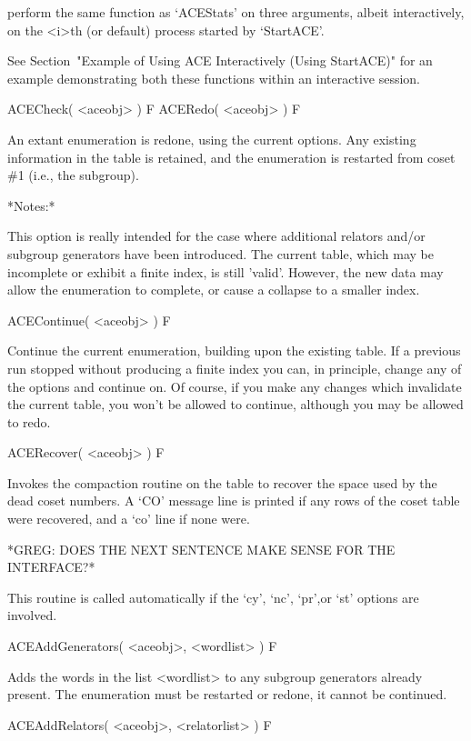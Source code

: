 perform the same function as `ACEStats'  on  three  arguments,  albeit
interactively,  on  the  <i>th  (or  default)   process   started   by
`StartACE'.

See Section~"Example of Using ACE Interactively (Using StartACE)"  for
an example demonstrating both these functions  within  an  interactive
session.


\>ACECheck( <aceobj> ) F
\>ACERedo( <aceobj> ) F

An extant  enumeration is redone,  using the current  options.  Any
existing information in the table  is retained, and the enumeration is
restarted from coset \#1 (i.e., the subgroup).

*Notes:*

This option is really intended  for the case where additional relators
and/or subgroup  generators have been introduced.   The current table,
which may be  incomplete or exhibit a finite  index, is still 'valid'.
However, the new data may  allow the enumeration to complete, or cause
a collapse to a smaller index.

\>ACEContinue( <aceobj> ) F

Continue the  current enumeration,  building upon the  existing table.
If a previous run stopped without producing a finite index you can, in
principle, change any  of the options and continue  on.  Of course,
if you make any changes  which invalidate the current table, you won't
be allowed to continue, although you may be allowed to redo.


\>ACERecover( <aceobj> ) F

Invokes the compaction routine on the table to recover the space  used
by the dead coset numbers. A `CO' message line is printed if any  rows
of the coset table were recovered, and a `co' line if none were.

*GREG: DOES THE NEXT SENTENCE MAKE SENSE FOR THE INTERFACE?*

This routine is  called automatically if the `cy',  `nc', `pr',or `st'
options are involved.


\>ACEAddGenerators( <aceobj>, <wordlist> ) F

Adds the words in the list <wordlist> to any subgroup generators already
present.
The enumeration must be restarted or redone, it cannot be continued.

\>ACEAddRelators( <aceobj>, <relatorlist> ) F

